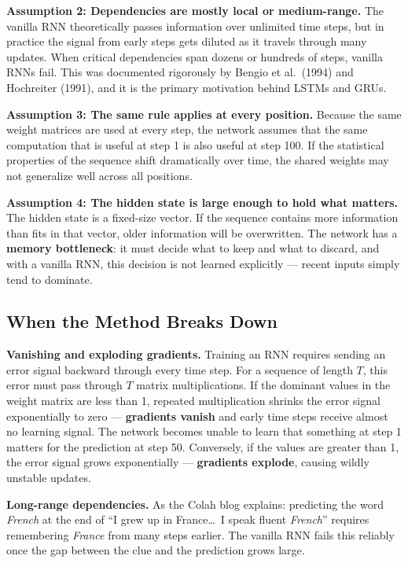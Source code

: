 \documentclass[12pt,a4paper]{article}
\begin{document}
\textbf{Assumption 2: Dependencies are mostly local or medium-range.}
The vanilla RNN theoretically passes information over unlimited time steps, but in
practice the signal from early steps gets diluted as it travels through many updates.
When critical dependencies span dozens or hundreds of steps, vanilla RNNs fail.
This was documented rigorously by Bengio et al.\ (1994) and Hochreiter (1991), and
it is the primary motivation behind LSTMs and GRUs.

\textbf{Assumption 3: The same rule applies at every position.}
Because the same weight matrices are used at every step, the network assumes that the
same computation that is useful at step 1 is also useful at step 100. If the
statistical properties of the sequence shift dramatically over time, the shared weights
may not generalize well across all positions.

\textbf{Assumption 4: The hidden state is large enough to hold what matters.}
The hidden state is a fixed-size vector. If the sequence contains more information than
fits in that vector, older information will be overwritten. The network has a
\textbf{memory bottleneck}: it must decide what to keep and what to discard, and with
a vanilla RNN, this decision is not learned explicitly --- recent inputs simply tend to
dominate.

\subsection{When the Method Breaks Down}

\textbf{Vanishing and exploding gradients.}
Training an RNN requires sending an error signal backward through every time step.
For a sequence of length $T$, this error must pass through $T$ matrix multiplications.
If the dominant values in the weight matrix are less than 1, repeated multiplication
shrinks the error signal exponentially to zero --- \textbf{gradients vanish} and early
time steps receive almost no learning signal. The network becomes unable to learn that
something at step 1 matters for the prediction at step 50. Conversely, if the values
are greater than 1, the error signal grows exponentially --- \textbf{gradients explode},
causing wildly unstable updates.

\textbf{Long-range dependencies.}
As the Colah blog explains: predicting the word \textit{French} at the end of ``I grew
up in France\ldots\ I speak fluent \textit{French}'' requires remembering
\textit{France} from many steps earlier. The vanilla RNN fails this reliably once the
gap between the clue and the prediction grows large.
\end{document}
